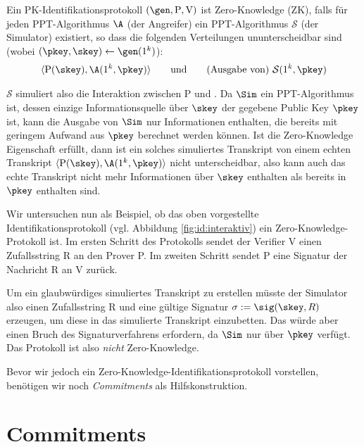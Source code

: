 \begin{definition}
\label{def:zk}
Ein PK-Identifikationsprotokoll $(\gen, \mathrm{P}, \mathrm{V})$ ist Zero-Knowledge (ZK), falls für jeden PPT-Algorithmus $\A$ (der
Angreifer) ein PPT-Algorithmus $\mathcal{S}$ (der Simulator) existiert, so dass die folgenden Verteilungen ununterscheidbar sind (wobei
$(\pkey, \skey) \leftarrow \gen(1^k)$):
\begin{align*}
\langle \mathrm{P}(\skey), \A(1^k, \pkey) \rangle \text{\qquad und\qquad (Ausgabe von) } \mathcal{S}(1^k, \pkey)
\end{align*}
\end{definition}

$\mathcal{S}$ simuliert also die Interaktion zwischen P und \A. Da $\Sim$ ein PPT-Algorithmus ist, dessen einzige Informationsquelle über $\skey$ der gegebene Public Key $\pkey$ ist, kann die Ausgabe von $\Sim$ nur Informationen enthalten, die bereits mit geringem Aufwand aus $\pkey$ berechnet werden können. Ist die Zero-Knowledge Eigenschaft erfüllt, dann ist ein solches simuliertes Transkript von einem echten Transkript $\langle \mathrm{P}(\skey), \A(1^k, \pkey) \rangle$ nicht unterscheidbar, also kann auch das echte Transkript nicht mehr Informationen über $\skey$ enthalten als bereits in $\pkey$ enthalten sind.

Wir untersuchen nun als Beispiel, ob das oben vorgestellte Identifikationsprotokoll (vgl. Abbildung \ref{fig:id:interaktiv}) ein Zero-Knowledge-Protokoll ist. Im ersten Schritt des Protokolls sendet der Verifier V einen Zufallsstring R an den Prover P. Im zweiten Schritt sendet P eine Signatur der Nachricht R an V zurück.

Um ein glaubwürdiges simuliertes Transkript zu erstellen müsste der Simulator also einen Zufallsstring R und eine gültige Signatur $\sigma := \sig(\skey, R)$ erzeugen, um diese in das simulierte Transkript einzubetten. Das würde aber einen Bruch des Signaturverfahrens erfordern, da $\Sim$ nur über $\pkey$ verfügt. Das Protokoll ist also \emph{nicht} Zero-Knowledge.

Bevor wir jedoch ein Zero-Knowledge-Identifikationsprotokoll vorstellen, benötigen wir noch \emph{Commitments} als Hilfskonstruktion.


\section{Commitments}


